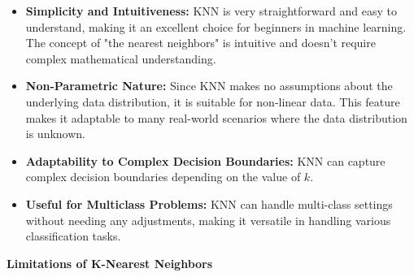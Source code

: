 \documentclass[letterpaper,10pt]{article}
\begin{document}
\begin{itemize}
    \item \textbf{Simplicity and Intuitiveness:} KNN is very straightforward and easy to understand, making it an excellent choice for beginners in machine learning. The concept of "the nearest neighbors" is intuitive and doesn't require complex mathematical understanding.


    \item \textbf{Non-Parametric Nature:} Since KNN makes no assumptions about the underlying data distribution, it is suitable for non-linear data. This feature makes it adaptable to many real-world scenarios where the data distribution is unknown.

    \item \textbf{Adaptability to Complex Decision Boundaries:} KNN can capture complex decision boundaries depending on the value of \( k \).

    \item \textbf{Useful for Multiclass Problems:} KNN can handle multi-class settings without needing any adjustments, making it versatile in handling various classification tasks.
\end{itemize}

\textbf{Limitations of K-Nearest Neighbors}
\end{document}
